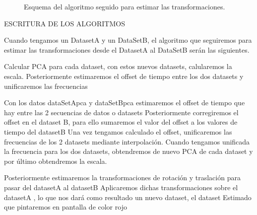\begin{figure}[H]
\begin{center}
\hspace{0.5cm}

\end{center}

\caption{Esquema del algoritmo seguido para estimar las transformaciones.}
\end{figure}

ESCRITURA DE LOS ALGORITMOS


Cuando tengamos un DatasetA y un DataSetB, el algoritmo que seguiremos para estimar las transformaciones desde el DatasetA al DataSetB serán las siguientes.

Calcular PCA para cada dataset, con estos nuevos datasets, calularemos la escala. Posteriormente estimaremos el offset de tiempo entre los dos datasets y unificaremos las 
frecuencias

Con los datos dataSetApca y dataSetBpca estimaremos el offset de tiempo que hay entre las 2 secuencias de datos o datasets
Posteriormente corregiremos el offset en el dataset B, para ello sumaremos el valor del offset a los valores de tiempo del datasetB
Una vez tengamos calculado el offset, unificaremos las frecuencias de los 2 datasets mediante interpolación.
Cuando tengamos unificada la frecuencia para los dos datasets, obtendremos de nuevo PCA de cada dataset y por último obtendremos la escala.

Posteriormente estimaremos  la transformaciones de rotación y traslación para pasar del datasetA al datasetB
Aplicaremos dichas transformaciones sobre el datasetA , lo que nos dará como resultado un nuevo dataset, el dataset Estimado que pintaremos en pantalla de color rojo

